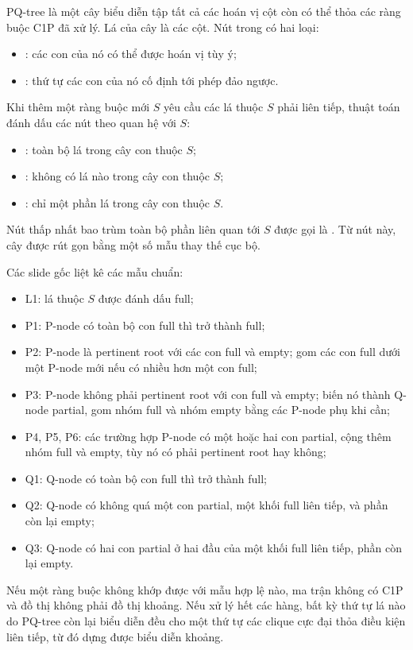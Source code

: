 \documentclass[11pt]{article}
\begin{document}
PQ-tree là một cây biểu diễn tập tất cả các hoán vị cột còn có thể thỏa các
ràng buộc C1P đã xử lý. Lá của cây là các cột. Nút trong có hai loại:
\begin{itemize}
  \item {}: các con của nó có thể được hoán vị tùy ý;
  \item {}: thứ tự các con của nó cố định tới phép đảo ngược.
\end{itemize}

Khi thêm một ràng buộc mới $S$ yêu cầu các lá thuộc $S$ phải liên tiếp, thuật
toán đánh dấu các nút theo quan hệ với $S$:
\begin{itemize}
  \item {}: toàn bộ lá trong cây con thuộc $S$;
  \item {}: không có lá nào trong cây con thuộc $S$;
  \item {}: chỉ một phần lá trong cây con thuộc $S$.
\end{itemize}
Nút thấp nhất bao trùm toàn bộ phần liên quan tới $S$ được gọi là
. Từ nút này, cây được rút gọn bằng một số mẫu thay thế
cục bộ.

Các slide gốc liệt kê các mẫu chuẩn:
\begin{itemize}
  \item L1: lá thuộc $S$ được đánh dấu full;
  \item P1: P-node có toàn bộ con full thì trở thành full;
  \item P2: P-node là pertinent root với các con full và empty; gom các con
  full dưới một P-node mới nếu có nhiều hơn một con full;
  \item P3: P-node không phải pertinent root với con full và empty; biến nó
  thành Q-node partial, gom nhóm full và nhóm empty bằng các P-node phụ khi
  cần;
  \item P4, P5, P6: các trường hợp P-node có một hoặc hai con partial, cộng
  thêm nhóm full và empty, tùy nó có phải pertinent root hay không;
  \item Q1: Q-node có toàn bộ con full thì trở thành full;
  \item Q2: Q-node có không quá một con partial, một khối full liên tiếp, và
  phần còn lại empty;
  \item Q3: Q-node có hai con partial ở hai đầu của một khối full liên tiếp,
  phần còn lại empty.
\end{itemize}

Nếu một ràng buộc không khớp được với mẫu hợp lệ nào, ma trận không có C1P và
đồ thị không phải đồ thị khoảng. Nếu xử lý hết các hàng, bất kỳ thứ tự lá nào
do PQ-tree còn lại biểu diễn đều cho một thứ tự các clique cực đại thỏa điều
kiện liên tiếp, từ đó dựng được biểu diễn khoảng.
\end{document}
